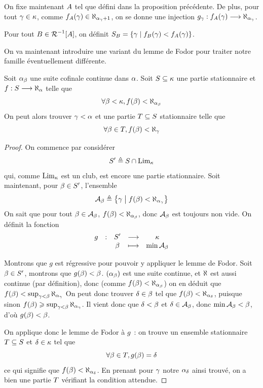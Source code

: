 \begin{notation}
  On fixe maintenant $A$ tel que défini dans la proposition précédente. De
  plus, pour tout $\gamma \in \kappa$, comme
  $f_{A}(\gamma) \in \aleph_{\alpha_\gamma + 1}$, on se donne une injection
  $g_\gamma : \displaystyle f_{A}(\gamma) \longrightarrow \aleph_{\alpha_\gamma}$.

  Pour tout $B\in\mathord{\mathrel{\mathcal{R}}}^{-1}[A]$, on définit
  $S_{B} = \left\{ \gamma \;\middle\vert\; f_{B}(\gamma) < f_{A}(\gamma) \right\}$.
\end{notation}

On va maintenant introduire une variant du lemme de Fodor pour traiter notre
famille éventuellement différente.

\begin{lemma}
  Soit $\alpha_\beta$ une suite cofinale continue dans $\alpha$. Soit
  $S\subseteq\kappa$ une partie stationnaire et
  $f : \displaystyle S \longrightarrow \aleph_\alpha$ telle que
  \[\forall \beta < \kappa, f(\beta) < \aleph_{\alpha_\beta}\]
  On peut alors trouver $\gamma < \alpha$ et une partie $T\subseteq S$
  stationnaire telle que
  \[\forall \beta \in T, f(\beta) < \aleph_\gamma\]
\end{lemma}

\begin{proof}
  On commence par considérer
  \[S' \triangleq S \cap \operatorname{Lim}_\kappa\]
  qui, comme $\operatorname{Lim}_\kappa$ est un club, est encore une partie stationnaire.
  Soit maintenant, pour $\beta \in S'$, l'ensemble
  \[\mathcal A_\beta \triangleq \left\{ \gamma \;\middle\vert\; f(\beta) < \aleph_{\alpha_\gamma} \right\}\]
  On sait que pour tout $\beta \in \mathcal A_\beta$,
  $f(\beta) < \aleph_{\alpha_\beta}$,
  donc $\mathcal A_\beta$ est toujours non vide. On définit la fonction
  \[\makeFun{g}{\varSt'}{\varCk}{\varOb}{\min\varFam_\varOb}\]

  Montrons que $g$ est régressive pour pouvoir y appliquer le lemme de Fodor.
  Soit $\beta \in S'$, montrons que $g(\beta) < \beta$.
  $(\alpha_\beta)$ est une suite continue, et $\aleph$ est aussi continue (par
  définition), donc (comme $f(\beta) < \aleph_{\alpha_\beta}$) on en déduit que
  $f(\beta) < \sup_{\gamma < \beta} \aleph_{\alpha_\gamma}$
  On peut donc trouver $\delta \in \beta$ tel que
  $f(\beta) < \aleph_{\alpha_\delta}$, puisque sinon
  $f(\beta) \geqslant \sup_{\gamma < \beta} \aleph_{\alpha_\gamma}$.
  Il vient donc que $\delta < \beta$ et $\delta \in \mathcal A_\beta$, donc
  $\min \mathcal A_\beta < \beta$, d'où $g(\beta) < \beta$.

  On applique donc le lemme de Fodor à $g$~: on trouve un ensemble stationnaire
  $T\subseteq S$ et $\delta \in \kappa$ tel que
  \[\forall \beta \in T, g(\beta) = \delta\]
  ce qui signifie que $f(\beta) < \aleph_{\alpha_\delta}$. En prenant pour
  $\gamma$ notre $\alpha_\delta$ ainsi trouvé, on a bien une partie $T$
  vérifiant la condition attendue.
\end{proof}

